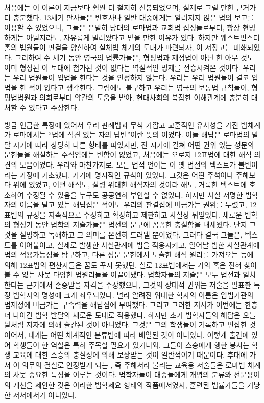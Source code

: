 처음에는 이 이론이 지금보다 훨씬 더 철저히 신봉되었으며,
실제로 그럴 만한 근거가 더 충분했다.
13세기 판사들은 변호사나 일반 대중에게는 알려지지 않은
법의 보고를 이용할 수 있었으니,
그들은 은밀히 당대의 로마법과 교회법 집성들로부터, 항상 현명하게는 아닐지라도,
자유롭게 빌려왔다고 믿을 만한 이유가 있다.
하지만 웨스트민스터 홀의 법원들이 판결을 양산하여 실체법 체계의 토대가 마련되자,
이 저장고는 폐쇄되었다.
그리하여 수 세기 동안 영국의 법률가들은, 형평법과 제정법이 아닌 한 아무 것도
이미 형성된 이 토대에 첨가된 것이 없다는 역설적인 명제를 전승시켜온 것이다.
우리는 우리 법원들이 입법을 한다는 것을 인정하지 않는다.
우리는 우리 법원들이 결코 입법을 한 적이 없다고 생각한다.
그럼에도 불구하고 우리는 영국의 보통법 규칙들이, 형평법법원과
의회로부터 약간의 도움을 받아, 현대사회의 복잡한 이해관계에 충분히 대처할 수 있다고 주장한다.

방금 언급한 특징에 있어서 우리 판례법과 무척 가깝고 교훈적인 유사성을 가진 법체계가
로마에서는 ``법에 식견 있는 자의 답변''이란 뜻의 이었다.
이들 해답은 로마법의 발달 시기에 따라 상당히 다른 형태를 띠었지만,
전 시기에 걸쳐 어떤 권위 있는 성문의 문헌들을 해설하는 주석임에는 변함이 없었고,
처음에는 오로지 12표법에 대한 해석 의견의 모음이었다.
우리와 마찬가지로, 모든 법적 언어는 이 옛 법전의 텍스트가 불변이라는 가정에 기초했다.
거기에 명시적인 규칙이 있었다.
그것은 어떤 주석이나 주해보다 위에 있었고, 어떤 해석도, 설령 위대한 해석자의 것이라 해도,
거룩한 텍스트에 호소하여 수정될 수 있음을 누구도 공공연히 부인할 수 없었다.
하지만 사실 저명한 법학자의 이름을 달고 있는 해답집은
적어도 우리의 판결집에 버금가는 권위를 누렸고,
12표법의 규정을 지속적으로 수정하고 확장하고 제한하고 사실상 뒤엎었다.
새로운 법학의 형성기 동안 법학의 저술가들은 법전의 문구에 꼼꼼한 충실함을 내세웠다.
단지 그것을 설명하고 독해하고 그 의미를 온전히 드러낼 뿐이었다.
그러다 결국 그들은, 텍스트를 이어붙이고,
실제로 발생한 사실관계에 법을 적응시키고,
일어날 법한 사실관계에 법의 적용가능성을 탐구하고,
다른 성문 문헌에서 도출한 해석 원리를 가져오는 등에 의해
12표법의 편찬자들은 꿈도 꾸지 못했던, 실로 12표법에서는 거의 혹은 전혀 찾아볼 수 없는
사뭇 다양한 법원리들을 이끌어냈다.
법학자들의 저술은 모두 법전과 일치한다는 근거에서 존중받을 자격을 주장했으나,
그것의 상대적 권위는 저술을 발표한 특정 법학자의 명성에 크게 좌우되었다.
널리 알려진 위대한 학자의 이름은 입법기관의 법제정에 버금가는 구속력을 해답집에 부여했다.
그리고 그러한 저서가 이번에는 한층 더 나아간 법학 발달의 새로운 토대로 작용했다.
하지만 초기 법학자들의 해답은 오늘날처럼 저자에 의해 출간된 것이 아니었다.
그것은 그의 학생들이 기록하고 편집한 것이어서,
대개는 어떤 체계적인 분류법에 따라 배열된 것이 아니었다.
이렇게 출간에 있어 학생들이 한 역할은 특히 주목할 필요가 있거니와,
그들이 스승에게 행한 봉사는 학생 교육에 대한 스승의 충실성에 의해 보상받는 것이 일반적이기 때문이다.
후대에 가서 이 의무의 결실로 인정받게 되는
, 즉
주해서라 불리는 교육용 저술들은
로마법 체계의 사뭇 중요한 특징을 이루는 것이다.
법학자들이 대중들에게 개념의 분류와 전문용어의 개선을 제안한 것은
이러한 법학제요 형태의 작품에서였지, 훈련된 법률가들을 겨냥한 저서에서가 아니었다.

